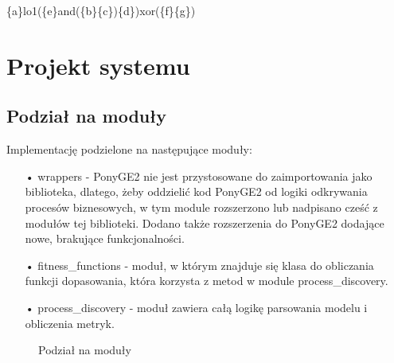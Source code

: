 \begin{center}
\{a\}lo1(\{e\}and(\{b\}\{c\})\{d\})xor(\{f\}\{g\})
\end{center}

\section{Projekt systemu}

\subsection{Podział na moduły}

Implementację podzielone na następujące moduły:
\begin{itemize}
  \item[•] wrappers - PonyGE2 nie jest przystosowane do zaimportowania jako biblioteka, dlatego, żeby oddzielić kod PonyGE2 od logiki odkrywania procesów biznesowych, w tym module rozszerzono lub nadpisano cześć z modułów tej biblioteki. Dodano także rozszerzenia do PonyGE2 dodające nowe, brakujące funkcjonalności.
  \item[•] fitness{\_}functions - moduł, w którym znajduje się klasa do obliczania funkcji dopasowania, która korzysta z metod w module process{\_}discovery.
  \item[•] process{\_}discovery - moduł zawiera całą logikę parsowania modelu i obliczenia metryk.
\end{itemize}


\begin{figure}[!ht]
	\caption{\label{fig:flow_chart}Podział na moduły}
\end{figure}

